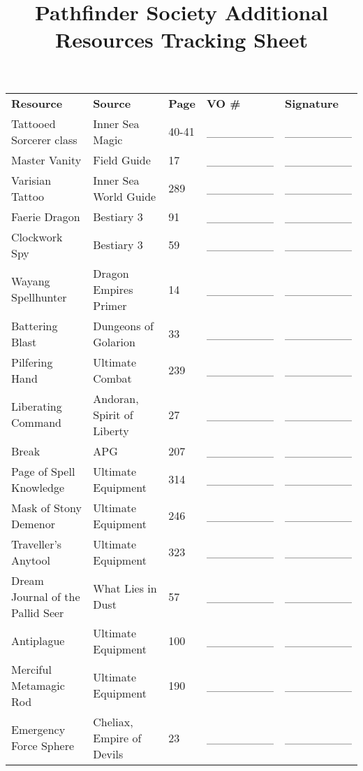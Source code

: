 \documentclass[a4paper,10pt]{article}
\title{Pathfinder Society Additional Resources Tracking Sheet}
\begin{document}
\maketitle
\begin{center}
\begin{tabular}{lllll}
\textbf{Resource} & \textbf{Source} & \textbf{Page} & \textbf{VO \#} & \textbf{Signature} \\ 
Tattooed Sorcerer class & Inner Sea Magic & 40-41 & \_\_\_\_\_\_\_\_ & \_\_\_\_\_\_\_\_ \\ 
Master Vanity & Field Guide & 17 & \_\_\_\_\_\_\_\_ & \_\_\_\_\_\_\_\_ \\ 
Varisian Tattoo & Inner Sea World Guide & 289 & \_\_\_\_\_\_\_\_ & \_\_\_\_\_\_\_\_ \\ 
Faerie Dragon & Bestiary 3 & 91 & \_\_\_\_\_\_\_\_ & \_\_\_\_\_\_\_\_ \\ 
Clockwork Spy & Bestiary 3 & 59 & \_\_\_\_\_\_\_\_ & \_\_\_\_\_\_\_\_ \\ 
Wayang Spellhunter & Dragon Empires Primer & 14 & \_\_\_\_\_\_\_\_ & \_\_\_\_\_\_\_\_ \\ 
Battering Blast & Dungeons of Golarion & 33 & \_\_\_\_\_\_\_\_ & \_\_\_\_\_\_\_\_ \\ 
Pilfering Hand & Ultimate Combat & 239 & \_\_\_\_\_\_\_\_ & \_\_\_\_\_\_\_\_ \\ 
Liberating Command & Andoran, Spirit of Liberty & 27 & \_\_\_\_\_\_\_\_ & \_\_\_\_\_\_\_\_ \\ 
Break & APG & 207 & \_\_\_\_\_\_\_\_ & \_\_\_\_\_\_\_\_ \\ 
Page of Spell Knowledge & Ultimate Equipment & 314 & \_\_\_\_\_\_\_\_ & \_\_\_\_\_\_\_\_ \\ 
Mask of Stony Demenor & Ultimate Equipment & 246 & \_\_\_\_\_\_\_\_ & \_\_\_\_\_\_\_\_ \\ 
Traveller's Anytool & Ultimate Equipment & 323 & \_\_\_\_\_\_\_\_ & \_\_\_\_\_\_\_\_ \\ 
Dream Journal of the Pallid Seer & What Lies in Dust &57 & \_\_\_\_\_\_\_\_ & \_\_\_\_\_\_\_\_ \\ 
Antiplague & Ultimate Equipment & 100 & \_\_\_\_\_\_\_\_ & \_\_\_\_\_\_\_\_ \\ 
Merciful Metamagic Rod & Ultimate Equipment & 190 & \_\_\_\_\_\_\_\_ & \_\_\_\_\_\_\_\_ \\ 
Emergency Force Sphere & Cheliax, Empire of Devils & 23 & \_\_\_\_\_\_\_\_ & \_\_\_\_\_\_\_\_ \\ 

\end{tabular}
\end{center}
\end{document}
